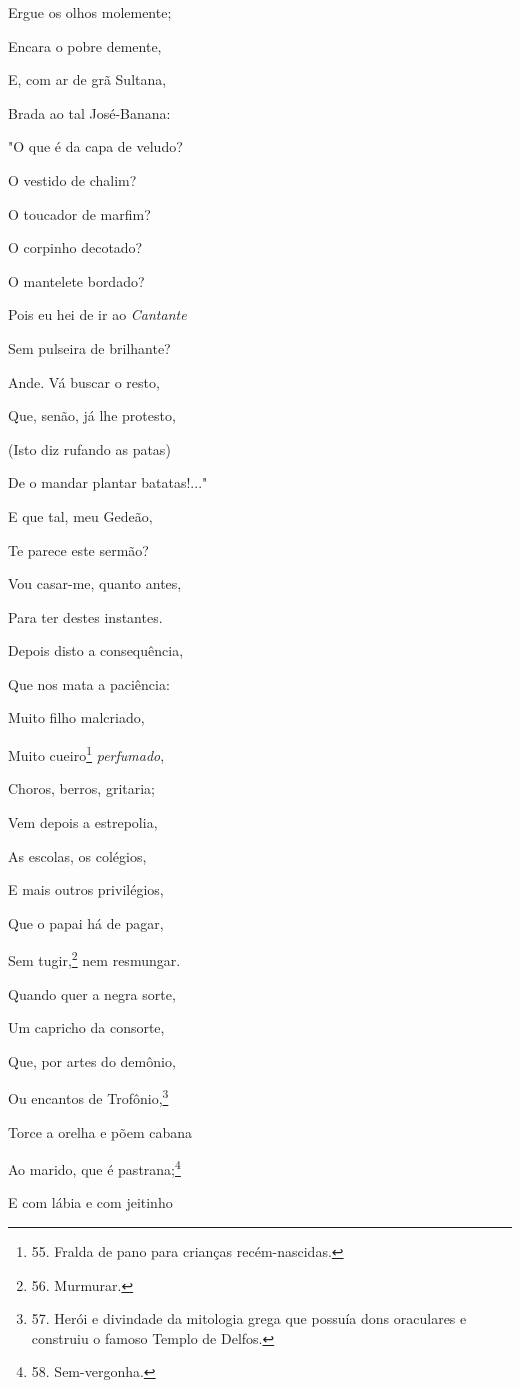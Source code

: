 Ergue os olhos molemente;

Encara o pobre demente,

E, com ar de grã Sultana,

Brada ao tal José-Banana:

"O que é da capa de veludo?

O vestido de chalim?

O toucador de marfim?

O corpinho decotado?

O mantelete bordado?

Pois eu hei de ir ao \emph{Cantante}

Sem pulseira de brilhante?

Ande. Vá buscar o resto,

Que, senão, já lhe protesto,

(Isto diz rufando as patas)

De o mandar plantar batatas!..."

E que tal, meu Gedeão,

Te parece este sermão?

Vou casar-me, quanto antes,

Para ter destes instantes.

Depois disto a consequência,

Que nos mata a paciência:

Muito filho malcriado,

Muito cueiro\footnote{55. Fralda de pano para crianças recém-nascidas.}
\emph{perfumado},

Choros, berros, gritaria;

Vem depois a estrepolia,

As escolas, os colégios,

E mais outros privilégios,

Que o papai há de pagar,

Sem tugir,\footnote{56. Murmurar.} nem resmungar.

Quando quer a negra sorte,

Um capricho da consorte,

Que, por artes do demônio,

Ou encantos de Trofônio,\footnote{57. Herói e divindade da mitologia
  grega que possuía dons oraculares e construiu o famoso Templo de
  Delfos.}

Torce a orelha e põem cabana

Ao marido, que é pastrana;\footnote{58. Sem-vergonha.}

E com lábia e com jeitinho

